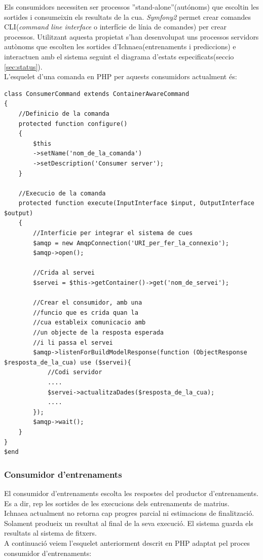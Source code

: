 Els consumidors necessiten ser processos ''stand-alone''(aut\'{o}noms) que escoltin les sortides i consumeixin els resultats de la cua. \textit{Symfony2} permet crear comandes CLI(\textit{command line interface} o interfície de línia de comandes) per crear processos. Utilitzant aquesta propietat s'han desenvolupat uns processos servidors autònoms que escolten les sortides d'Ichnaea(entrenaments i prediccions) e interactuen amb el sistema seguint el diagrama d'estats especificats(seccio \ref{sec:status}).\\

L'esquelet d'una comanda en PHP per aquests consumidors actualment \'{e}s:
\begin{lstlisting}
class ConsumerCommand extends ContainerAwareCommand
{
	//Definicio de la comanda
	protected function configure()
	{
		$this
		->setName('nom_de_la_comanda')
		->setDescription('Consumer server');
	}
	
	//Execucio de la comanda
	protected function execute(InputInterface $input, OutputInterface $output)
	{
		//Interficie per integrar el sistema de cues
		$amqp = new AmqpConnection('URI_per_fer_la_connexio');
		$amqp->open();
		
		//Crida al servei
		$servei = $this->getContainer()->get('nom_de_servei');
		
		//Crear el consumidor, amb una 
		//funcio que es crida quan la 
		//cua estableix comunicacio amb 
		//un objecte de la resposta esperada 
		//i li passa el servei 
		$amqp->listenForBuildModelResponse(function (ObjectResponse $resposta_de_la_cua) use ($servei){
		 	//Codi servidor
		 	....
			$servei->actualitzaDades($resposta_de_la_cua);
			....
		});
		$amqp->wait();
	}
}
$end
\end{lstlisting}

\subsubsection{Consumidor d'entrenaments}
El consumidor d'entrenaments escolta les respostes del productor d'entrenaments. Es a dir, rep les sortides de les execucions dels entrenaments de matrius.\\

Ichnaea actualment no retorna cap progres parcial ni estimacions de finalitzaci\'{o}. Solament produeix un resultat al final de la seva execució. El sistema guarda els resultats al sistema de fitxers.\\

A continuació veiem l'esquelet anteriorment descrit en PHP adaptat pel proces consumidor d'entrenaments:

